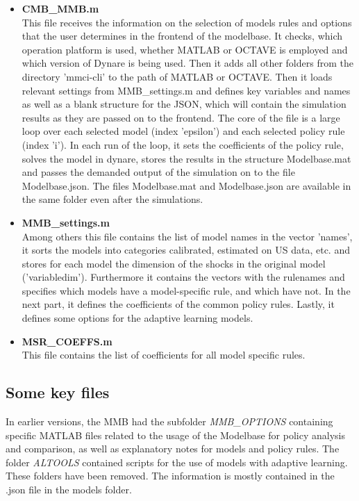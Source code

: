 \begin{itemize}
\item \textbf{CMB\_MMB.m}\\
This file receives the information on the selection of models rules and options that the user determines in the frontend of the modelbase. It checks, which operation platform is used, whether MATLAB or OCTAVE is employed and which version of Dynare is being used. Then it adds all other folders from the directory 'mmci-cli' to the path of MATLAB or OCTAVE. Then it loads relevant settings from MMB\_settings.m and defines key variables and names as well as a blank structure for the JSON, which will contain the simulation results as they are passed on to the frontend. The core of the file is a large loop over each selected model (index 'epsilon') and each selected policy rule (index 'i'). In each run of the loop, it sets the coefficients of the policy rule, solves the model in dynare, stores the results in the structure Modelbase.mat and passes the demanded output of the simulation on to the file Modelbase.json. The files Modelbase.mat and Modelbase.json are available in the same folder even after the simulations.
\item \textbf{MMB\_settings.m}\\
Among others this file contains the list of model names in the vector 'names', it sorts the models into categories calibrated, estimated on US data, etc. and stores for each model the dimension of the shocks in the original model ('variabledim'). Furthermore it contains the vectors with the rulenames and specifies which models have a model-specific rule, and which have not. In the next part, it defines the coefficients of the common policy rules. Lastly, it defines some options for the adaptive learning models.
\item \textbf{MSR\_COEFFS.m}\\
This file contains the list of coefficients for all model specific rules.
\end{itemize}



\subsection*{Some key files}
In earlier versions, the MMB had the subfolder \textit{MMB\_OPTIONS} containing specific MATLAB files related to the usage of the Modelbase for policy analysis and comparison, as well as explanatory notes for models and policy rules. The folder \textit{ALTOOLS} contained scripts for the use of models with adaptive learning. These folders have been removed. The information is mostly contained in the .json file in the models folder.   

